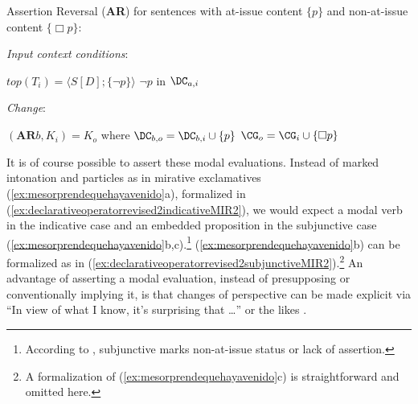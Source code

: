 \begin{exe}
\ex\label{ex:assertiondenialOBV} 
Assertion Reversal (\textbf{AR}) for sentences with at-issue content $\{ p \}$ and non-at-issue content $\{ \Box p \}$:
	\begin{xlist}
		\ex \textit{Input context conditions}: 
		\begin{xlist}
			\ex $\textit{top}(T_i)=\langle S [D];\{\neg p \}\rangle$
			\ex $\neg p$ in $\DC_{a,i}$ 
		\end{xlist}
		
		\ex \textit{Change}:
		\begin{xlist}
			\ex $(\textbf{AR}b,K_i)=K_o$ where $\DC_{b,o}=\DC_{b,i}\cup \{ p \}$ 
			\ex $\CG_{o} = \CG_{i} \cup \{ \Box p \}$
		\end{xlist}
	\end{xlist}
\end{exe}

It is of course possible to assert these modal evaluations. Instead of marked intonation and particles as in mirative exclamatives (\ref{ex:mesorprendequehayavenido}a), formalized in (\ref{ex:declarativeoperatorrevised2indicativeMIR2}), we would expect a modal verb in the indicative case and an embedded proposition in the subjunctive case (\ref{ex:mesorprendequehayavenido}b,c).\footnote{According to \citet[3]{Palmer.2001}, subjunctive marks non-at-issue status or lack of assertion.} (\ref{ex:mesorprendequehayavenido}b) can be formalized as in (\ref{ex:declarativeoperatorrevised2subjunctiveMIR2}).\footnote{A formalization of (\ref{ex:mesorprendequehayavenido}c) is straightforward and omitted here.} An advantage of asserting a modal evaluation, instead of presupposing or conventionally implying it, is that changes of perspective can be made explicit via ``In view of what I know, it's surprising that \ldots'' or the likes \citep{Kratzer.1981}. 

